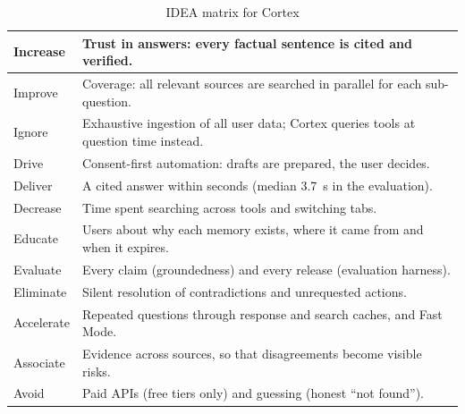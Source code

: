 \documentclass[oneside,a4paper,12pt]{report}
\begin{document}
\begin{appendices}
\begin{itemize}
\begin{table}[!htbp]
\begin{center}
\def\arraystretch{1.3}
\small
\begin{tabularx}{\textwidth}{| p{2.4cm} | X |}
\hline
Increase & Trust in answers: every factual sentence is cited and verified. \\ \hline
Improve & Coverage: all relevant sources are searched in parallel for each sub-question. \\ \hline
Ignore & Exhaustive ingestion of all user data; Cortex queries tools at question time instead. \\ \hline
Drive & Consent-first automation: drafts are prepared, the user decides. \\ \hline
Deliver & A cited answer within seconds (median 3.7~s in the evaluation). \\ \hline
Decrease & Time spent searching across tools and switching tabs. \\ \hline
Educate & Users about why each memory exists, where it came from and when it expires. \\ \hline
Evaluate & Every claim (groundedness) and every release (evaluation harness). \\ \hline
Eliminate & Silent resolution of contradictions and unrequested actions. \\ \hline
Accelerate & Repeated questions through response and search caches, and Fast Mode. \\ \hline
Associate & Evidence across sources, so that disagreements become visible risks. \\ \hline
Avoid & Paid APIs (free tiers only) and guessing (honest ``not found''). \\ \hline
\end{tabularx}
\end{center}
\caption{IDEA matrix for Cortex}
\label{tab:imatrix-cortex}
\end{table}


\end{itemize}
\end{appendices}
\end{document}
